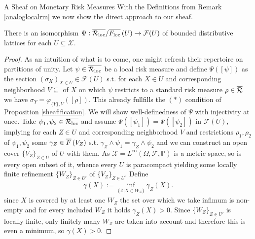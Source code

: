 \begin{subsection}{A Sheaf on Monetary Risk Measures}
    With the Definitions from Remark \ref{analoglocalrm} we now show the direct approach to our sheaf.
    \begin{theorem}
        There is an isomorphism \( \Psi : \overline{\mathcal{R}_{\text{loc}}} / \overline{F_{\text{loc}}}\left (U \right) \to \mathcal{F}(U) \) of bounded distributive lattices
        for each \( U \subseteq \mathcal{X} \).
    \end{theorem}
    \begin{proof}
        As an intuition of what is to come, one might refresh their repertoire on partitions of unity.
        Let \( \psi \in \overline{\mathcal{R}_{\text{loc}}} \) be a local risk measure and define \( \Psi([\psi]) \) as the section \( (\sigma_X)_{X \in U} \in \mathcal{F}(U) \)
        s.t. for each \( X \in U \) and corresponding neighborhood \( V \subseteq \) of \( X \) on which \( \psi \) restricts to a standard risk measure \( \rho \in \overline{\mathcal{R}} \)
        we have \( \sigma_Y = \varphi_{\{Y\}, V}([\rho]) \). This already fullfills the \( (\ast) \) condition of Proposition \ref{sheafification}.
        \newline
        \newline
        We will show well-definedness of \( \Psi \) with injectivity at once.
        Take \( \psi_1, \psi_2 \in \overline{\mathcal{R}_{\text{loc}}} \) and assume \( \Psi([\psi_1]) = \Psi([\psi_2]) \) in \( \mathcal{F}(U) \),
        implying for each \( Z \in U \) and corresponding neighborhood \( V \) and restrictions \( \rho_1, \rho_2 \)
        of \( \psi_1, \psi_2 \) some \( \gamma_Z \in \overline{F}\left (V_Z \right) \) s.t. \( \gamma_Z \wedge \psi_1 = \gamma_Z \wedge \psi_2 \)
        and we can construct an open cover \( \{V_Z\}_{Z \in U} \) of \( U \) with them.
        As \( \mathcal{X} = L^\infty(\Omega, \mathcal{F}, \mathbb{P}) \) is a metric space, so is every open subset of it, 
        whence every \( U \) is paracompact yielding some locally finite refinement \( \{W_Z\}_{Z \in U'} \) of \( \{V_Z\}_{Z \in U} \).
        Define 
        \begin{align} \label{patchedlocalrm}
            \gamma(X) := \inf_{\{Z | X \in W_Z \}} \gamma_Z(X).
        \end{align}
        since \( X \) is covered by at least one \( W_Z \) the set over which we take infimum is non-empty 
        and for every included \( W_Z \) it holds \( \gamma_Z(X) > 0 \). Since \( \{W_Z\}_{Z \in U'} \) is locally finite,
        only finitely many \( W_Z \) are taken into account and therefore this is even a minimum, so \( \gamma(X) > 0 \).

\end{proof}
\end{subsection}
